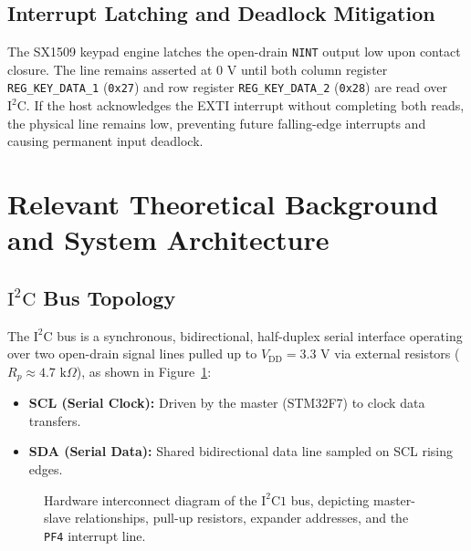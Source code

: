 \subsection{Interrupt Latching and Deadlock Mitigation}
The SX1509 keypad engine latches the open-drain \texttt{NINT} output low upon contact closure. The line remains asserted at $0\text{ V}$ until both column register \texttt{REG\_KEY\_DATA\_1} (\texttt{0x27}) and row register \texttt{REG\_KEY\_DATA\_2} (\texttt{0x28}) are read over $\text{I}^2\text{C}$. If the host acknowledges the EXTI interrupt without completing both reads, the physical line remains low, preventing future falling-edge interrupts and causing permanent input deadlock.

\section{Relevant Theoretical Background and System Architecture}

\subsection{\texorpdfstring{$\text{I}^2\text{C}$}{I2C} Bus Topology}
The $\text{I}^2\text{C}$ bus is a synchronous, bidirectional, half-duplex serial interface operating over two open-drain signal lines pulled up to $V_{\text{DD}} = 3.3\text{ V}$ via external resistors ($R_p \approx 4.7\text{ k}\Omega$), as shown in Figure~\ref{fig:i2c_architecture}:
\begin{itemize}[noitemsep,topsep=2pt]
    \item \textbf{SCL (Serial Clock):} Driven by the master (STM32F7) to clock data transfers.
    \item \textbf{SDA (Serial Data):} Shared bidirectional data line sampled on SCL rising edges.
\end{itemize}

\begin{figure}[htbp]
    \centering
    \caption{Hardware interconnect diagram of the $\text{I}^2\text{C}1$ bus, depicting master-slave relationships, pull-up resistors, expander addresses, and the \texttt{PF4} interrupt line.}
    \label{fig:i2c_architecture}
\end{figure}

